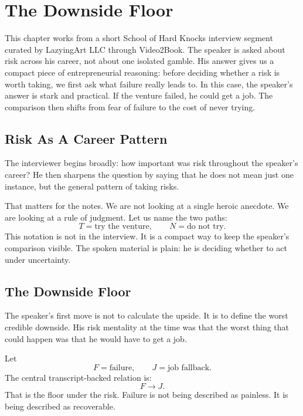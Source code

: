 \chapter{The Downside Floor}

This chapter works from a short School of Hard Knocks interview segment curated by LazyingArt LLC through Video2Book. The speaker is asked about risk across his career, not about one isolated gamble. His answer gives us a compact piece of entrepreneurial reasoning: before deciding whether a risk is worth taking, we first ask what failure really leads to. In this case, the speaker's answer is stark and practical. If the venture failed, he could get a job. The comparison then shifts from fear of failure to the cost of never trying.

\section{Risk As A Career Pattern}

The interviewer begins broadly: how important was risk throughout the speaker's career? He then sharpens the question by saying that he does not mean just one instance, but the general pattern of taking risks.

That matters for the notes. We are not looking at a single heroic anecdote. We are looking at a rule of judgment. Let us name the two paths:
\begin{equation}
T = \text{try the venture},
\qquad
N = \text{do not try}.
\end{equation}
This notation is not in the interview. It is a compact way to keep the speaker's comparison visible. The spoken material is plain: he is deciding whether to act under uncertainty.

\section{The Downside Floor}

The speaker's first move is not to calculate the upside. It is to define the worst credible downside. His risk mentality at the time was that the worst thing that could happen was that he would have to get a job.

Let
\[
F = \text{failure},
\qquad
J = \text{job fallback}.
\]
The central transcript-backed relation is:
\begin{equation}
F \longrightarrow J.
\end{equation}
That is the floor under the risk. Failure is not being described as painless. It is being described as recoverable.

